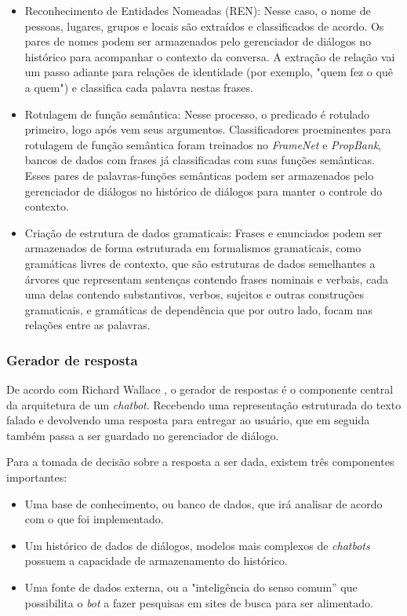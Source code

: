 \documentclass[
	12pt,				%
	oneside,
	a4paper,			%
	english,			%
	french,				%
	spanish,			%
	brazil				%
	]{abntex2}
\begin{document}
\begin{itemize}
	\item Reconhecimento de Entidades Nomeadas (REN): Nesse caso, o nome de pessoas, lugares, grupos e locais são extraídos e classificados de acordo. Os pares de nomes podem ser armazenados pelo gerenciador de diálogos no histórico para acompanhar o contexto da conversa. A extração de relação vai um passo adiante para relações de identidade (por exemplo, "quem fez o quê a quem") e classifica cada palavra nestas frases.
	\item Rotulagem de função semântica: Nesse processo, o predicado é rotulado primeiro, logo após vem seus argumentos. Classificadores proeminentes para rotulagem de função semântica foram treinados no \emph{FrameNet} e \emph{PropBank}, bancos de dados com frases já classificadas com suas funções semânticas. Esses pares de palavras-funções semânticas podem ser armazenados pelo gerenciador de diálogos no histórico de diálogos para manter o controle do contexto.
	\item Criação de estrutura de dados gramaticais: Frases e enunciados podem ser armazenados de forma estruturada em formalismos gramaticais, como gramáticas livres de contexto, que são estruturas de dados semelhantes a árvores que representam sentenças contendo frases nominais e verbais, cada uma delas contendo substantivos, verbos, sujeitos e outras construções gramaticais, e gramáticas de dependência que por outro lado, focam nas relações entre as palavras. 
\end{itemize}


\subsubsection{Gerador de resposta}
De acordo com Richard Wallace \supercite{response-generator}, o gerador de respostas é o componente central da arquitetura de um \emph{chatbot}. Recebendo uma representação estruturada do texto falado e devolvendo uma resposta para entregar ao usuário, que em seguida também passa a ser guardado no gerenciador de diálogo.

Para a tomada de decisão sobre a resposta a ser dada, existem três componentes importantes:
\begin{itemize}
	\item Uma base de conhecimento, ou banco de dados, que irá analisar de acordo com o que foi implementado.
	\item Um histórico de dados de diálogos, modelos mais complexos de \emph{chatbots} possuem a capacidade de armazenamento do histórico.
	\item Uma fonte de dados externa, ou a "inteligência do senso comum” que possibilita o \emph{bot} a fazer pesquisas em sites de busca para ser alimentado.
\end{itemize}
\end{document}
